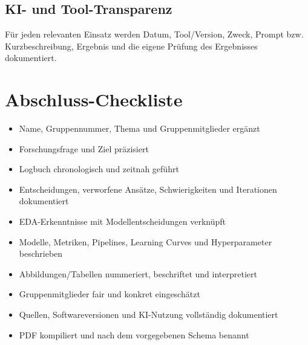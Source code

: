 \documentclass[11pt,a4paper]{article}
\begin{document}
\subsection{KI- und Tool-Transparenz}
Für jeden relevanten Einsatz werden Datum, Tool/Version, Zweck, Prompt bzw. Kurzbeschreibung,
Ergebnis und die eigene Prüfung des Ergebnisses dokumentiert.

\appendix
\section{Abschluss-Checkliste}
\begin{itemize}
  \item Name, Gruppennummer, Thema und Gruppenmitglieder ergänzt
  \item Forschungsfrage und Ziel präzisiert
  \item Logbuch chronologisch und zeitnah geführt
  \item Entscheidungen, verworfene Ansätze, Schwierigkeiten und Iterationen dokumentiert
  \item EDA-Erkenntnisse mit Modellentscheidungen verknüpft
  \item Modelle, Metriken, Pipelines, Learning Curves und Hyperparameter beschrieben
  \item Abbildungen/Tabellen nummeriert, beschriftet und interpretiert
  \item Gruppenmitglieder fair und konkret eingeschätzt
  \item Quellen, Softwareversionen und KI-Nutzung vollständig dokumentiert
  \item PDF kompiliert und nach dem vorgegebenen Schema benannt
\end{itemize}
\end{document}
